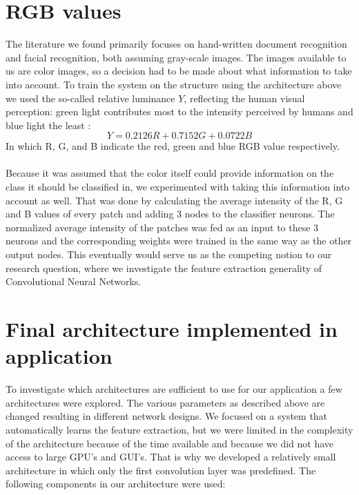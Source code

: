 \documentclass[a4paper,onecolumn]{report}
\begin{document}
\section{RGB values}
\label{sec:RGB}
The literature we found primarily focuses on hand-written document recognition and facial recognition, both assuming gray-scale images. The images available to us are color images, so a decision had to be made about what information to take into account. To train the system on the structure using the architecture above we used the so-called relative luminance $Y$, reflecting the human visual perception: green light contributes most to the intensity perceived by humans and blue light the least \cite{stokes1996standard}:
\begin{equation}
Y=0.2126 R+0.7152 G+0.0722 B
\end{equation}
\noindent
In which R, G, and B indicate the red, green and blue RGB value respectively.
\\\\
Because it was assumed that the color itself could provide information on the class it should be classified in, we experimented with taking this information into account as well. That was done by calculating the average intensity of the R, G and B values of every patch and adding 3 nodes to the classifier neurons. The normalized average intensity of the patches was fed as an input to these 3 neurons and the corresponding weights were trained in the same way as the other output nodes. This eventually would serve us as the competing notion to our research question, where we investigate the feature extraction generality of Convolutional Neural Networks. 

\section{Final architecture implemented in application}
\label{sec:finalimpl}
To investigate which architectures are sufficient to use for our application a few architectures were explored. The various parameters as described above are changed resulting in different network designs. We focused on a system that automatically learns the feature extraction, but we were limited in the complexity of the architecture because of the time available and because we did not have access to large GPU's and GUI's. That is why we developed a relatively small architecture in which only the first convolution layer was predefined. The following components in our architecture were used:
\end{document}
